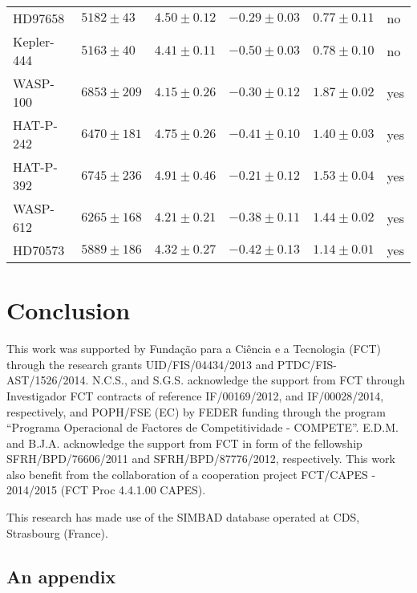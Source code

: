 \documentclass{aa}
\begin{document}
\begin{table*}[htb!]
\begin{tabular}{llllll}
      HD97658     &    $5182 \pm 43 $    &  $4.50 \pm 0.12$    &  $-0.29 \pm 0.03$    &  $0.77 \pm 0.11$             &   no  \\
      Kepler-444  &    $5163 \pm 40 $    &  $4.41 \pm 0.11$    &  $-0.50 \pm 0.03$    &  $0.78 \pm 0.10$             &   no  \\
      WASP-100    &    $6853 \pm 209$    &  $4.15 \pm 0.26$    &  $-0.30 \pm 0.12$    &  $1.87 \pm 0.02$             &  yes  \\
      HAT-P-242   &    $6470 \pm 181$    &  $4.75 \pm 0.26$    &  $-0.41 \pm 0.10$    &  $1.40 \pm 0.03$             &  yes  \\
      HAT-P-392   &    $6745 \pm 236$    &  $4.91 \pm 0.46$    &  $-0.21 \pm 0.12$    &  $1.53 \pm 0.04$             &  yes  \\
      WASP-612    &    $6265 \pm 168$    &  $4.21 \pm 0.21$    &  $-0.38 \pm 0.11$    &  $1.44 \pm 0.02$             &  yes  \\
      HD70573     &    $5889 \pm 186$    &  $4.32 \pm 0.27$    &  $-0.42 \pm 0.13$    &  $1.14 \pm 0.01$             &  yes  \\
      \hline
    \end{tabular}
\end{table*}





\section{Conclusion}
\label{sec:conclusion}




\begin{acknowledgements}

This work was supported by Funda\c{c}\~ao para a Ci\^encia e a
Tecnologia (FCT) through the research grants UID/FIS/04434/2013 and
PTDC/FIS-AST/1526/2014. N.C.S., and S.G.S. acknowledge the support from
FCT through Investigador FCT contracts of reference IF/00169/2012, and
IF/00028/2014, respectively, and POPH/FSE (EC) by FEDER funding through
the program “Programa Operacional de Factores de Competitividade
- COMPETE”. E.D.M. and B.J.A. acknowledge the support from FCT in
form of the fellowship SFRH/BPD/76606/2011 and SFRH/BPD/87776/2012,
respectively. This work also benefit from the collaboration of a
cooperation project FCT/CAPES - 2014/2015 (FCT Proc 4.4.1.00 CAPES).

This research has made use of the SIMBAD database operated at CDS,
Strasbourg (France).

\end{acknowledgements}






\begin{appendix}
\section{An appendix}


\end{appendix}
\end{document}
